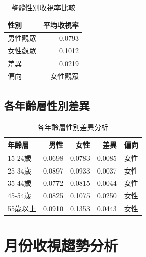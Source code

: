 \documentclass[11pt,a4paper]{article}
\begin{document}
\begin{table}[H]
\centering
\caption{整體性別收視率比較}
\begin{tabular}{lr}
\toprule
性別 & 平均收視率 \\
\midrule
男性觀眾 & 0.0793 \\
女性觀眾 & 0.1012 \\
差異 & 0.0219 \\
偏向 & 女性觀眾 \\
\bottomrule
\end{tabular}
\end{table}

\subsection{各年齡層性別差異}

\begin{table}[H]
\centering
\caption{各年齡層性別差異分析}
\begin{tabular}{lrrrl}
\toprule
年齡層 & 男性 & 女性 & 差異 & 偏向 \\
\midrule
15-24歲 & 0.0698 & 0.0783 & 0.0085 & 女性 \\
25-34歲 & 0.0897 & 0.0933 & 0.0037 & 女性 \\
35-44歲 & 0.0772 & 0.0815 & 0.0044 & 女性 \\
45-54歲 & 0.0825 & 0.1075 & 0.0250 & 女性 \\
55歲以上 & 0.0910 & 0.1353 & 0.0443 & 女性 \\

\bottomrule
\end{tabular}
\end{table}

\section{月份收視趨勢分析}
\end{document}
